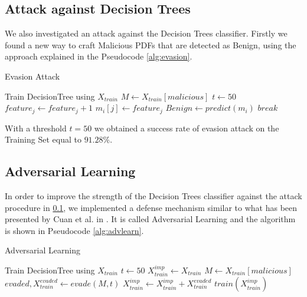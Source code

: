 \documentclass[twocolumn, switch]{article} %
\begin{document}
\subsection{Attack against Decision Trees}
\label{subsec:tree}
We also investigated an attack against the Decision Trees classifier. Firstly we found a new way to craft Malicious PDFs that are detected as Benign, using the approach explained in the Pseudocode \ref{alg:evasion}.
\begin{algorithm}
	{\footnotesize
		\caption{Evasion Attack}\label{alg:evasion}
		\begin{algorithmic}
			\Require Train DecisionTree using $X_{train}$
			\State $M \gets X_{train}[malicious]$
			\State $t \gets 50$
			\State $feature_j \gets feature_j + 1$
			\State $m_i[j] \gets feature_j$
			\State $Benign \gets predict(m_i)$
			\State $break$  
			\EndIf
			\EndWhile
			\EndFor
			\EndFor
		\end{algorithmic}
	}
\end{algorithm}

With a threshold $t=50$ we obtained a success rate of evasion attack on the Training Set equal to $91.28\%$.

\subsection{Adversarial Learning}
In order to improve the strength of the Decision Trees classifier against the attack procedure in \ref{subsec:tree}, we implemented a defense mechanism similar to what has been presented by Cuan et al. in \cite{cuan_damien_delaplace_valois_2018}.
It is called Adversarial Learning and the algorithm is shown in Pseudocode \ref{alg:advlearn}.

\begin{algorithm}
	{\footnotesize
		\caption{Adversarial Learning}\label{alg:advlearn}
		\begin{algorithmic}
			\Require Train DecisionTree using $X_{train}$
			\State $t \gets 50$
			\State $X_{train}^{imp} \gets X_{train}$
			\State $M \gets X_{train}[malicious]$
			\While{$\#PDF evaded > 0$}
			\State $evaded,X_{train}^{evaded} \gets evade(M,t)$
			\If{$evaded$ is $True$}
			\State $X_{train}^{imp} \gets X_{train}^{imp} + X_{train}^{evaded}$
			\EndIf
			\State $train(X_{train}^{imp})$
			\EndWhile
		\end{algorithmic}
	}
\end{algorithm}
\end{document}
